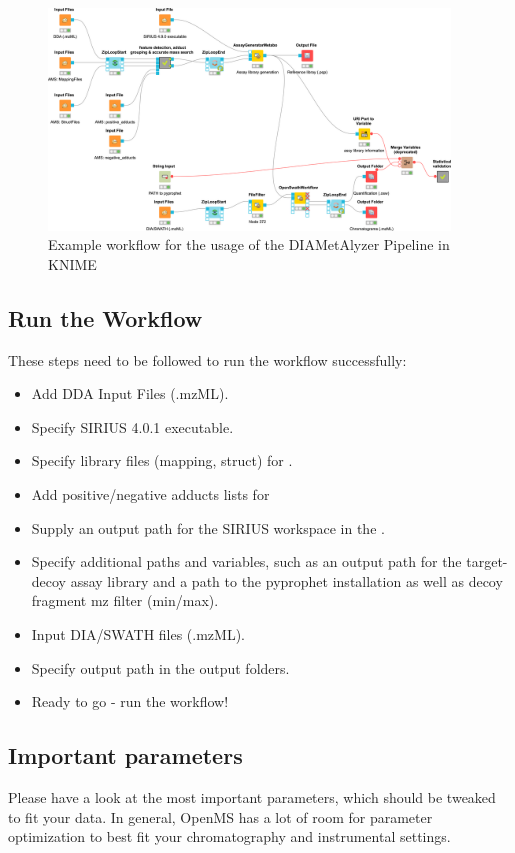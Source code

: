 \begin{figure}[!h]
  \centering
  \includegraphics[width=0.95\textwidth]{graphics/openswathmetabo/oswm_example_wf.png}
  \caption{Example workflow for the usage of the DIAMetAlyzer Pipeline in KNIME}
  \label{fig:oswm_example_wf}
\end{figure}

\subsection{Run the Workflow}
These steps need to be followed to run the workflow successfully:

\begin{itemize}
\item Add DDA Input Files (.mzML).
\item Specify SIRIUS 4.0.1 executable.
\item Specify library files (mapping, struct) for .
\item Add positive/negative adducts lists for 
\item Supply an output path for the SIRIUS workspace in the .
\item Specify additional paths and variables, such as an output path for the target-decoy assay library and a path to the pyprophet installation as well as decoy fragment mz filter (min/max).
\item Input DIA/SWATH files (.mzML).
\item Specify output path in the output folders.
\item Ready to go - run the workflow! 
\end{itemize}

\subsection{Important parameters}
\noindent Please have a look at the most important parameters, which should be tweaked to fit your data. In general, OpenMS has a lot of room for parameter optimization to best fit your chromatography and instrumental settings. \\

